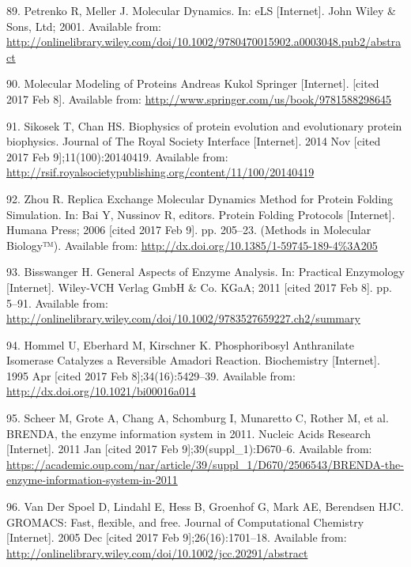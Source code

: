 \documentclass[12pt,twoside]{reedthesis}
\begin{document}
  \hypertarget{ref-petrenko_molecular_2001}{}
  89. Petrenko R, Meller J. Molecular Dynamics. In: eLS {[}Internet{]}.
  John Wiley \& Sons, Ltd; 2001. Available from:
  \url{http://onlinelibrary.wiley.com/doi/10.1002/9780470015902.a0003048.pub2/abstract}
  
  \hypertarget{ref-kukol_molecular_2008}{}
  90. Molecular Modeling of Proteins Andreas Kukol Springer
  {[}Internet{]}. {[}cited 2017 Feb 8{]}. Available from:
  \url{http://www.springer.com/us/book/9781588298645}
  
  \hypertarget{ref-sikosek_biophysics_2014}{}
  91. Sikosek T, Chan HS. Biophysics of protein evolution and evolutionary
  protein biophysics. Journal of The Royal Society Interface
  {[}Internet{]}. 2014 Nov {[}cited 2017 Feb 9{]};11(100):20140419.
  Available from:
  \url{http://rsif.royalsocietypublishing.org/content/11/100/20140419}
  
  \hypertarget{ref-bai_replica_2006}{}
  92. Zhou R. Replica Exchange Molecular Dynamics Method for Protein
  Folding Simulation. In: Bai Y, Nussinov R, editors. Protein Folding
  Protocols {[}Internet{]}. Humana Press; 2006 {[}cited 2017 Feb 9{]}. pp.
  205--23. (Methods in Molecular Biology™). Available from:
  \url{http://dx.doi.org/10.1385/1-59745-189-4\%3A205}
  
  \hypertarget{ref-bisswanger_general_2011}{}
  93. Bisswanger H. General Aspects of Enzyme Analysis. In: Practical
  Enzymology {[}Internet{]}. Wiley-VCH Verlag GmbH \& Co. KGaA; 2011
  {[}cited 2017 Feb 8{]}. pp. 5--91. Available from:
  \url{http://onlinelibrary.wiley.com/doi/10.1002/9783527659227.ch2/summary}
  
  \hypertarget{ref-hommel_phosphoribosyl_1995}{}
  94. Hommel U, Eberhard M, Kirschner K. Phosphoribosyl Anthranilate
  Isomerase Catalyzes a Reversible Amadori Reaction. Biochemistry
  {[}Internet{]}. 1995 Apr {[}cited 2017 Feb 8{]};34(16):5429--39.
  Available from: \url{http://dx.doi.org/10.1021/bi00016a014}
  
  \hypertarget{ref-scheer_brenda_2011}{}
  95. Scheer M, Grote A, Chang A, Schomburg I, Munaretto C, Rother M, et
  al. BRENDA, the enzyme information system in 2011. Nucleic Acids
  Research {[}Internet{]}. 2011 Jan {[}cited 2017 Feb
  9{]};39(suppl\_1):D670--6. Available from:
  \url{https://academic.oup.com/nar/article/39/suppl_1/D670/2506543/BRENDA-the-enzyme-information-system-in-2011}
  
  \hypertarget{ref-van_der_spoel_gromacs_2005}{}
  96. Van Der Spoel D, Lindahl E, Hess B, Groenhof G, Mark AE, Berendsen
  HJC. GROMACS: Fast, flexible, and free. Journal of Computational
  Chemistry {[}Internet{]}. 2005 Dec {[}cited 2017 Feb
  9{]};26(16):1701--18. Available from:
  \url{http://onlinelibrary.wiley.com/doi/10.1002/jcc.20291/abstract}
  
\end{document}
